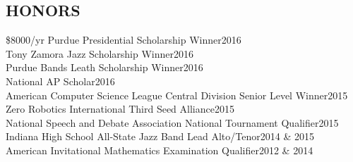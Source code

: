 \documentclass[line,margin]{res}
\begin{document}
\begin{resume}





  \section{HONORS}
  \$8000/yr Purdue Presidential Scholarship Winner\hfill 2016\\
  Tony Zamora Jazz Scholarship Winner\hfill 2016\\
  Purdue Bands Leath Scholarship Winner\hfill 2016\\
  National AP Scholar\hfill 2016\\
  American Computer Science League Central Division Senior Level Winner\hfill 2015\\
  Zero Robotics International Third Seed Alliance\hfill 2015\\
  National Speech and Debate Association National Tournament Qualifier\hfill 2015\\
  Indiana High School All-State Jazz Band Lead Alto/Tenor\hfill 2014 \& 2015\\
  American Invitational Mathematics Examination Qualifier\hfill 2012 \& 2014

\end{resume}
\end{document}
